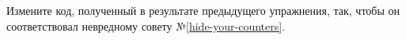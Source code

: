 Измените код, полученный в результате предыдущего упражнения,
так, чтобы он соответствовал невредному совету №\ref{hide-your-counters}.
